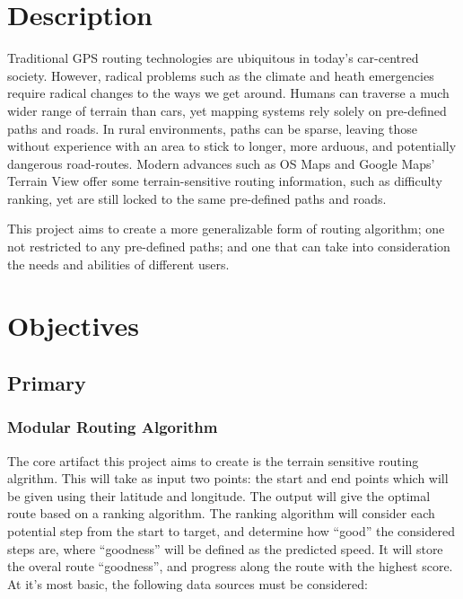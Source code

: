 \hypertarget{description}{%
\section{Description}\label{description}}

Traditional GPS routing technologies are ubiquitous in today's
car-centred society. However, radical problems such as the climate and
heath emergencies require radical changes to the ways we get around.
Humans can traverse a much wider range of terrain than cars, yet mapping
systems rely solely on pre-defined paths and roads. In rural
environments, paths can be sparse, leaving those without experience with
an area to stick to longer, more arduous, and potentially dangerous
road-routes. Modern advances such as OS Maps and Google Maps' Terrain
View offer some terrain-sensitive routing information, such as
difficulty ranking, yet are still locked to the same pre-defined paths
and roads.

This project aims to create a more generalizable form of routing
algorithm; one not restricted to any pre-defined paths; and one that can
take into consideration the needs and abilities of different users.

\hypertarget{objectives}{%
\section{Objectives}\label{objectives}}

\hypertarget{primary}{%
\subsection{Primary}\label{primary}}

\hypertarget{modular-routing-algorithm}{%
\subsubsection{Modular Routing
Algorithm}\label{modular-routing-algorithm}}

The core artifact this project aims to create is the terrain sensitive
routing algrithm. This will take as input two points: the start and end
points which will be given using their latitude and longitude. The
output will give the optimal route based on a ranking algorithm. The
ranking algorithm will consider each potential step from the start to
target, and determine how ``good'' the considered steps are, where
``goodness'' will be defined as the predicted speed. It will store the
overal route ``goodness'', and progress along the route with the highest
score. At it's most basic, the following data sources must be
considered:

